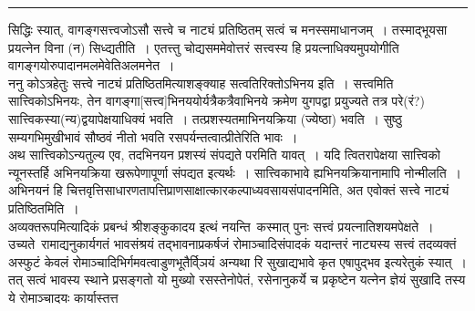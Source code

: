 \documentclass[11pt, openany]{book}
\begin{document}
\hrule

\vspace{2mm}

\noindent
सिद्धिः स्यात्, वागङ्गसत्त्वजोऽसौ सत्त्वे च नाट्यं प्रतिष्ठितम् सत्वं च मनस्समाधानजम्~। तस्माद्भूयसा प्रयत्नेन विना (न) सिध्द्यतीति~। एतत्त्तु चोद्यसममेवोत्तरं सत्त्वस्य हि प्रयत्नाधिक्यमुपयोगीति वागङ्गयोरुपादानमलमेवेतिअलमनेत~। \\

ननु कोऽत्रहेतुः सत्त्वे नाट्यं प्रतिष्ठितमित्याशङ्क्याह सत्वतिरिक्तोऽभिनय इति~। सत्त्वमिति सात्त्विकोऽभिनयः, तेन वागङ्गा[सत्त्व]भिनययोर्यत्रैकत्रैवाभिनये क्रमेण युगपद्वा प्रयुज्यते तत्र परे(रं?) सात्त्विकस्या(न्य)द्वयापेक्षयाधिक्यं भवति~। तत्प्रशस्यतमाभिनयक्रिया (ज्येष्ठा) भवति~। सुष्ठु सम्यगभिमुखीभावं सौष्ठवं नीतो भवति रसपर्यन्तत्वात्प्रीतेरिति भावः~। \\

अथ सात्त्विकोऽन्यतुल्य एव, तदभिनयन प्रशस्यं संपद्यते परमिति यावत्~। यदि त्वितरापेक्षया सात्त्विको न्यूनस्तर्हि अभिनयक्रिया खरूपेणापूर्णा संपद्यत इत्यर्थः~। सात्त्विकाभावे ह्यभिनयक्रियानामापि नोन्मीलति~। अभिनयनं हि चित्तवृत्तिसाधारणतापत्तिप्राणसाक्षात्कारकल्पाध्यवसायसंपादनमिति, अत एवोक्तं सत्त्वे नाट्यं प्रतिष्ठितमिति~। \\

अव्यक्तरूपमित्यादिकं प्रबन्धं श्रीशङ्कुकादय इत्थं नयन्ति\textendash\ कस्मात् पुनः सत्त्वं प्रयत्नातिशयमपेक्षते~। उच्यते\textendash\ रामाद्यनुकार्यगतं भावसंश्रयं तद्भावनाप्रकर्षजं रोमाञ्चादिसंपादकं यदान्तरं नाट्यस्य सत्त्वं तदव्यक्तं अस्फुटं केवलं रोमाञ्चादिभिर्गमवत्वाडुणभूतैर्वि्ञयं अन्यथा रि सुखाद्यभावे कृत एषापुद्भव इत्यरेतुकं स्यात्~। तत् सत्वं भावस्य स्थाने प्रसङ्गतो यो मुख्यो रसस्तेनोपेतं, रसेनानुकर्ये च प्रकृष्टेन यत्नेन ज्ञेयं सुखादि तस्य ये रोमाञ्चादयः कार्यास्तत्त\textendash\ 


\newpage
\end{document}
